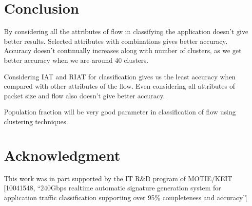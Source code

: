 \documentclass[conference]{IEEEtran}
\begin{document}



\section{Conclusion}
\label{sec:conc}
By considering all the attributes of flow in classifying the application doesn't give better results. Selected attributes with combinations gives better accuracy. Accuracy doesn't continually increases along with number of clusters, as we get better accuracy when we are around 40 clusters.

Considering IAT and RIAT for classification gives us the least accuracy when compared with other attributes of the flow. Even considering all attributes of packet size and flow also doesn't give better accuracy.

Population fraction will be very good parameter in classification of flow using clustering techniques.




\section*{Acknowledgment}
This work was in part supported by the IT R\&D program of MOTIE/KEIT
[10041548,
``240Gbps realtime automatic signature generation
system for application traffic classification supporting over 95\%
completeness and accuracy'']







%






\end{document}
